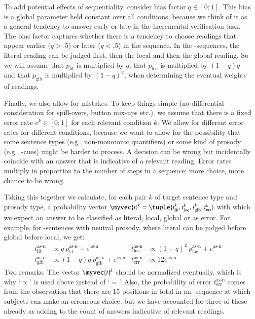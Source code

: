 \documentclass[fleqn,reqno,10pt]{article}
\newcommand{\as}{\acro{as}}
\newcommand{\ec}{\acro{ec}}
\begin{document}
To add potential effects of sequentiality, consider bias factor $q \in
[0;1]$. This bias is a global parameter held constant over all
conditions, because we think of it as a general tendency to answer
early or late in the incremental verification task. The bias factor
captures whether there is a tendency to choose readings that appear
earlier ($q > .5$) or later ($q <.5$) in the sequence. In the
\as-sequences, the literal reading can be judged first, then the local
and then the global reading. So we will assume that $p_{\text{lit}}$
is multiplied by $q$, that $p_{\text{loc}}$ is multiplied by $(1-q)q$
and that $p_{\text{glb}}$ is multiplied by $(1-q)^2$, when determining
the eventual weights of readings.

Finally, we also allow for mistakes. To keep things simple (no
differential consideration for spill-overs, button mix-ups etc.), we
assume that there is a fixed error rate $e^k \in [0;1]$ for each
relevant condition $k$. We allow for different error rates for
different conditions, because we want to allow for the possibility
that some sentence types (e.g., non-monotonic quantifiers) or some
kind of prosody (e.g., \ec-cues) might be harder to process. A
decision can be wrong but incidentally coincide with an answer that is
indicative of a relevant reading. Error rates multiply in proportion
to the number of steps in a sequence: more choice, more chance to be
wrong.

Taking this together we calculate, for each pair $k$ of target
sentence type and prosody type, a probability vector $\myvec{t}^k =
\tuple{t^k_{\text{lit}},t^k_{\text{loc}},t^k_{\text{glb}},t^k_{\text{err}}}$
with which we expect an answer to be classified as literal, local,
global or as error. For example, for \as-sentences with neutral
prosody, where literal can be judged before global before local, we
get:
\begin{align*}
  t^{\text{as-n}}_{\text{lit}} & \propto q \
  p^\text{as-n}_{\text{lit}} + e^\text{as-n} &   t^{\text{as-n}}_{\text{loc}} & \propto (1-q)^2 \
  p^\text{as-n}_{\text{loc}} + e^\text{as-n} \\
  t^{\text{as-n}}_{\text{glb}} & \propto (1-q)q \
  p^\text{as-n}_{\text{glb}} + e^\text{as-n} &   t^{\text{as-n}}_{\text{err}} &
  \propto 12 e^\text{as-n}
\end{align*}
Two remarks. The vector $\myvec{t}^k$ should be normalized eventually,
which is why `$\propto$' is used above instead of `$=$.' Also, the
probability of error $t^{\text{as-n}}_{\text{err}}$ comes from the
observation that there are 15 positions in total in an \as-sequence at
which subjects can make an erroneous choice, but we have accounted for
three of these already as adding to the count of answers indicative of
relevant readings.
\end{document}
